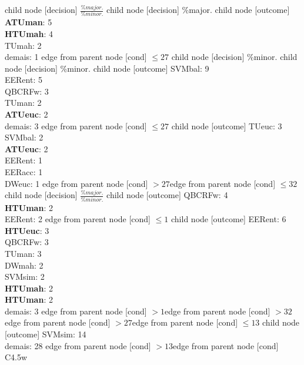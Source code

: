 child {node [decision] {$\frac{\%major.}{\%minor.}$}
child {node [decision] {\%major.}
child {node [outcome] {\textbf{ATUman}: 5\\
\textbf{HTUmah}: 4\\
TUmah: 2\\
demais: 1} edge from parent node [cond] {$\leq27$}}
child {node [decision] {\%minor.}
child {node [decision] {\%minor.}
child {node [outcome] {SVMbal: 9\\
EERent: 5\\
QBCRFw: 3\\
TUman: 2\\
\textbf{ATUeuc}: 2\\
demais: 3} edge from parent node [cond] {$\leq27$}}
child {node [outcome] {TUeuc: 3\\
SVMbal: 2\\
\textbf{ATUeuc}: 2\\
EERent: 1\\
EERacc: 1\\
DWeuc: 1} edge from parent node [cond] {$>27$}}edge from parent node [cond] {$\leq32$}}
child {node [decision] {$\frac{\%major.}{\%minor.}$}
child {node [outcome] {QBCRFw: 4\\
\textbf{HTUman}: 2\\
EERent: 2} edge from parent node [cond] {$\leq1$}}
child {node [outcome] {EERent: 6\\
\textbf{HTUeuc}: 3\\
QBCRFw: 3\\
TUman: 3\\
DWmah: 2\\
SVMsim: 2\\
\textbf{HTUmah}: 2\\
\textbf{HTUman}: 2\\
demais: 3} edge from parent node [cond] {$>1$}}edge from parent node [cond] {$>32$}}edge from parent node [cond] {$>27$}}edge from parent node [cond] {$\leq13$}}
child {node [outcome] {SVMsim: 14\\
demais: 28} edge from parent node [cond] {$>13$}}edge from parent node [cond] {C4.5w}}
